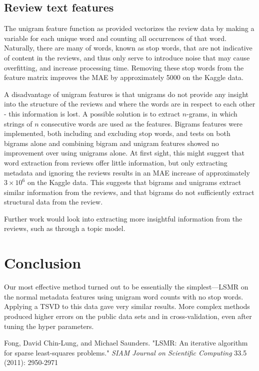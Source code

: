 \documentclass[11pt]{amsart}
\begin{document}
\subsection{Review text features}
The unigram feature function as provided vectorizes the review data by making a variable for each unique word and counting all occurrences of that word. Naturally, there are many of words, known as stop words, that are not indicative of content in the reviews, and thus only serve to introduce noise that may cause overfitting, and increase processing time. Removing these stop words from the feature matrix improves the MAE by approximately 5000 on the Kaggle data.

A disadvantage of unigram features is that unigrams do not provide any insight into the structure of the reviews and where the words are in respect to each other - this information is lost. A possible solution is to extract $n$-grams, in which strings of $n$ consecutive words are used as the features. Bigrams features were implemented, both including and excluding stop words, and tests on both bigrams alone and combining bigram and unigram features showed no improvement over using unigrams alone. At first sight, this might suggest that word extraction from reviews offer little information, but only extracting metadata and ignoring the reviews results in an MAE increase of approximately $3\times10^6$ on the Kaggle data. This suggests that bigrams and unigrams extract similar information from the reviews, and that bigrams do not sufficiently extract structural data from the review.

Further work would look into extracting more insightful information from the reviews, such as through a topic model.

\section{Conclusion}

Our most effective method turned out to be essentially the simplest---LSMR on the normal metadata features using unigram word counts with no stop words. Applying a TSVD to this data gave very similar results. More complex methods produced higher errors on the public data sets and in cross-validation, even after tuning the hyper parameters.

\begingroup
\begin{thebibliography}{9}

Fong, David Chin-Lung, and Michael Saunders. "LSMR: An iterative algorithm for sparse least-squares problems."
\emph{SIAM Journal on Scientific Computing} 33.5 (2011): 2950-2971

\end{thebibliography}
\endgroup
\end{document}
